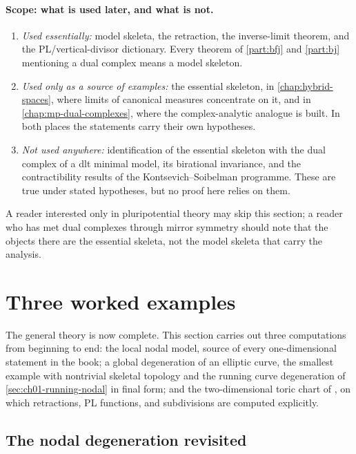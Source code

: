 \paragraph{Scope: what is used later, and what is not.}
\begin{enumerate}
\item \emph{Used essentially:} model skeleta, the retraction, the
  inverse-limit theorem, and the PL/vertical-divisor dictionary. Every
  theorem of \cref{part:bfj} and \cref{part:bj} mentioning a dual complex
  means a model skeleton.
\item \emph{Used only as a source of examples:} the essential skeleton, in
  \cref{chap:hybrid-spaces}, where limits of canonical measures concentrate
  on it, and in \cref{chap:mp-dual-complexes}, where the complex-analytic
  analogue is built. In both places the statements carry their own
  hypotheses.
\item \emph{Not used anywhere:} identification of the essential skeleton
  with the dual complex of a dlt minimal model, its birational invariance,
  and the contractibility results of the Kontsevich--Soibelman programme.
  These are true under stated hypotheses, but no proof here relies on them.
\end{enumerate}
A reader interested only in pluripotential theory may skip this section; a
reader who has met dual complexes through mirror symmetry should note that
the objects there are the essential skeleta, not the model skeleta that
carry the analysis.

\section{Three worked examples}
\label{sec:skeleton-worked}

The general theory is now complete. This section carries out three
computations from beginning to end: the local nodal model, source of every
one-dimensional statement in the book; a global degeneration of an elliptic
curve, the smallest example with nontrivial skeletal topology and the
running curve degeneration of \cref{sec:ch01-running-nodal} in final form;
and the two-dimensional toric chart of , on
which retractions, PL functions, and subdivisions are computed explicitly.

\subsection{The nodal degeneration revisited}

